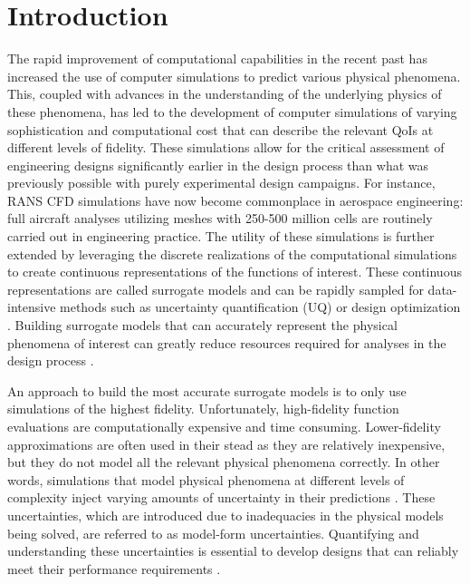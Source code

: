 \chapter{Introduction} \label{intro}

The rapid improvement of computational capabilities in the recent past has increased the use of computer simulations to predict various physical phenomena. This, coupled with advances in the understanding of the underlying physics of these phenomena, has led to the development of computer simulations of varying sophistication and computational cost that can describe the relevant QoIs at different levels of fidelity. These simulations allow for the critical assessment of engineering designs significantly earlier in the design process than what was previously possible with purely experimental design campaigns. For instance, RANS CFD simulations have now become commonplace in aerospace engineering: full aircraft analyses utilizing meshes with 250-500 million cells are routinely carried out in engineering practice. The utility of these simulations is further extended by leveraging the discrete realizations of the computational simulations to create continuous representations of the functions of interest. These continuous representations are called surrogate models and can be rapidly sampled for data-intensive methods such as uncertainty quantification (UQ) or design optimization \cite{queipo2005surrogate,gorissen2010surrogate}. Building surrogate models that can accurately represent the physical phenomena of interest can greatly reduce resources required for analyses in the design process \cite{jeong2005efficient}.

An approach to build the most accurate surrogate models is to only use simulations of the highest fidelity. Unfortunately, high-fidelity function evaluations are computationally expensive and time consuming. Lower-fidelity approximations are often used in their stead as they are relatively inexpensive, but they do not model all the relevant physical phenomena correctly. In other words, simulations that model physical phenomena at different levels of complexity inject varying amounts of uncertainty in their predictions \cite{peherstorfer_survey_2018}. These uncertainties, which are introduced due to inadequacies in the physical models being solved, are referred to as model-form uncertainties. Quantifying and understanding these uncertainties is essential to develop designs that can reliably meet their performance requirements \cite{forrester_multi-fidelity_2007}. 

